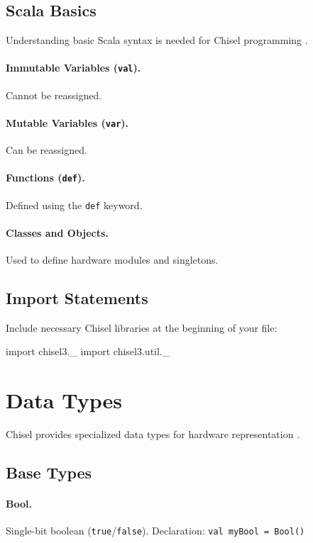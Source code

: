 \subsection{Scala Basics}
Understanding basic Scala syntax is needed for Chisel programming \cite{odersky2008programming}.

\paragraph{Immutable Variables (\texttt{val}).} Cannot be reassigned.
\paragraph{Mutable Variables (\texttt{var}).} Can be reassigned.
\paragraph{Functions (\texttt{def}).} Defined using the \texttt{def} keyword.
\paragraph{Classes and Objects.} Used to define hardware modules and singletons.

\subsection{Import Statements}
Include necessary Chisel libraries at the beginning of your file:

\begin{chiselcode}
import chisel3._
import chisel3.util._    
\end{chiselcode}

\section{Data Types}
Chisel provides specialized data types for hardware representation \cite{chisel-doc}.

\subsection{Base Types}
\paragraph{Bool.} Single-bit boolean (\texttt{true}/\texttt{false}). Declaration: \texttt{val myBool = Bool()}

